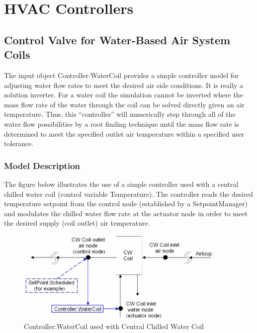 \section{HVAC Controllers }\label{hvac-controllers}

\subsection{Control Valve for Water-Based Air System Coils}\label{control-valve-for-water-based-air-system-coils}

The input object Controller:WaterCoil provides a simple controller model for adjusting water flow rates to meet the desired air side conditions. It is really a solution inverter. For a water coil the simulation cannot be inverted where the mass flow rate of the water through the coil can be solved directly given an air temperature. Thus, this ``controller'' will numerically step through all of the water flow possibilities by a root finding technique until the mass flow rate is determined to meet the specified outlet air temperature within a specified user tolerance.

\subsubsection{Model Description}\label{model-description-012}

The figure below illustrates the use of a simple controller used with a central chilled water coil (control variable Temperature). The controller reads the desired temperature setpoint from the control node (established by a SetpointManager) and modulates the chilled water flow rate at the actuator node in order to meet the desired supply (coil outlet) air temperature.

\begin{figure}[hbtp] %
\centering
\includegraphics[width=0.9\textwidth, height=0.9\textheight, keepaspectratio=true]{media/image4384.png}
\caption{Controller:WaterCoil used with Central Chilled Water Coil \protect \label{fig:controller-watercoil-used-with-central}}
\end{figure}

